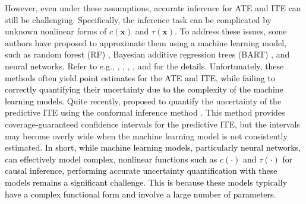 \documentclass[11pt]{article}
\newcommand{\bx}{{\boldsymbol x}}
\begin{document}
However, even under these assumptions, accurate inference for ATE and ITE can still be challenging. 
Specifically, the inference task can be complicated by unknown nonlinear forms 
of $c(\bx)$ and $\tau(\bx)$.
To address \textcolor{black}{these} issues, some authors have proposed to approximate them 
using a machine learning model, such as random forest (RF) \citep{breiman2001random}, Bayesian additive regression trees (BART) \citep{Chipman2010BARTBA}, and neural networks.  Refer to e.g.,
\cite{Foster2011SubgroupIF}, \cite{Hill2011bart},  \cite{shalit2017pehe},   \cite{wager2018nonpar2}, and \cite{hahn2020nonpar3} for the \textcolor{black}{details}. 
\textcolor{black}{Unfortunately, these methods often yield point estimates for  the ATE and ITE, while failing to correctly quantifying their uncertainty due to the complexity of the machine learning models.} Quite recently, \cite{lei2021ite} proposed to quantify the uncertainty of the predictive ITE  using the conformal inference method \citep{Vovk2005AlgorithmicLI,Shafer2008}. This method provides coverage-guaranteed confidence intervals for 
the predictive ITE,  but the intervals may become overly wide when the machine learning model is not consistently estimated. \textcolor{black}{In short, 
while machine learning models, particularly neural networks, can effectively model complex, nonlinear functions such as $c(\cdot)$ and $\tau(\cdot)$ for causal inference,  performing accurate uncertainty quantification with 
these models remains a significant challenge.
This is because these models typically have a complex functional form and involve a large number of parameters.} 
 
\end{document}
